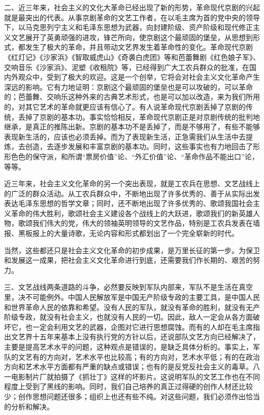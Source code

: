 二、近三年来，社会主义的文化大革命已经出现了新的形势，革命现代京剧的兴起就是最突出的代表。从事京剧革命的文艺工作者，在以毛主席为首的党中央的领导下，以马克思列宁主义和毛泽东思想为武器，向封建阶级、资产阶级和现代修正主义文艺展开了英勇顽强的进攻，锋芒所向，使京剧这个最顽固的堡垒，从思想到形式，都发生了极大的革命，并且带动文艺界发生着革命性的变化。革命现代京剧《红灯记》《沙家浜》《智取威虎山》《奇袭白虎团》等和芭蕾舞剧《红色娘子军》、交响音乐《沙家浜》、泥塑《收租院》等，已经得到广大工农兵群众的批准，在国内外观众中，受到了极大的欢迎。这是一个创举，它将会对社会主义文化革命产生深远的影响。它有力地证明：京剧这个最顽固的堡垒也是可以攻破的，可以革命的；芭蕾舞、交响乐这种外来的古典艺术形式，也是可以加以改造，来为我们所用的，对其它艺术的革命就更应该有信心了。有人说革命现代京剧丢掉了京剧的传统，丢掉了京剧的基本功。事实恰恰相反，革命现代京剧正是对京剧传统的批判地继承，是真正的推陈出新。京剧的基本功不是丢掉了，而是不够用了，有些不能够表现新生活的，应该也必须丢掉。而为了表现新生活，正急需我们从生活中去提炼，去创造，去逐步发展和丰富京剧的基本功。同时，这些事实也有力地回击了形形色色的保守派，和所谓“票房价值”论、“外汇价值”论、“革命作品不能出口”论，等等。

近三年来，社会主义文化革命的另一个突出表现，就是工农兵在思想、文艺战线上的广泛的群众活动。从工农兵群众中，不断地出现了许多优秀的、善于从实际出发表达毛泽东思想的哲学文章；同时，还不断地出现了许多优秀的、歌颂我国社会主义革命的伟大胜利，歌颂社会主义建设各个战线上的大跃进，歌颂我们的新英雄人物，歌颂我们伟大的党，伟大的领袖英明领导的文艺作品，特别是工农兵发表在墙报、黑板报上的大量诗歌，无论内容和形式都划出了一个完全崭新的时代。

当然，这些都还只是社会主义文化革命的初步成果，是万里长征的第一步。为保卫和发展这一成果，把社会主义文化革命进行到底，还需要我们作长期的、艰苦的努力。

三、文艺战线两条道路的斗争，必然要反映到军队内部来，军队不是生活在真空里，决不可能例外。中国人民解放军是中国无产阶级专政的主要工具，是中国人民和世界革命人民的依靠和希望。没有人民的军队，就没有革命的胜利，就没有无产阶级专政，就没有社会主义，也就没有人民的一切。因此，敌人一定会从各方面破坏它，也一定会利用文艺的武器，企图对它进行思想腐蚀。而有的人却在毛主席指出文艺界十五年来基本上没有执行党的方针以后，还说部队文艺方向已经解决了，主要是提高艺术水平的问题，这种观点是错误的，是缺乏具体分析的。事实上，军队的文艺有的方向对，艺术水平也比较高；有的方向对，艺术水平低；有的在政治方向和艺术水平方面都有严重的缺点或错误；也有的是反党反社会主义的毒草。八一电影制片厂就拍摄了《抓壮丁》这样的坏影片。这说明军队的文艺工作也在不同程度上受到了黑线的影响。同时，我们自己培养的真正过得硬的创作人材还比较少；创作思想问题还很多；组织上也还有些不纯。对这些问题，我们必须作出恰当的分析和解决。

